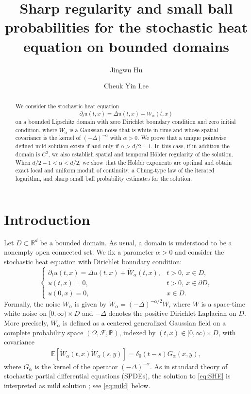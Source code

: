 \documentclass[reqno]{amsart}
\title[Stochastic heat equation]{Sharp regularity and small ball probabilities for the stochastic heat equation on bounded domains}
\author[J. Hu and C. Y. Lee]{Jingwu Hu \and Cheuk Yin Lee}
\newcommand{\R}{\mathbb R}
\newcommand{\E}{\mathbb E}
\renewcommand{\P}{\mathbb P}
\newcommand{\1}{\mathbf 1}
\numberwithin{equation}{section}
\theoremstyle{definition}
\begin{document}
\begin{abstract}
We consider the stochastic heat equation
\[
	\partial_t u(t,x) = \Delta u(t,x) + \dot{W}_\alpha(t,x)
\]
on a bounded Lipschitz domain with zero Dirichlet boundary condition and zero initial condition, where $\dot{W}_\alpha$ is a Gaussian noise that is white in time and whose spatial covariance is the kernel of $(-\Delta)^{-\alpha}$ with $\alpha>0$. We prove that a unique pointwise defined mild solution exists if and only if $\alpha>d/2-1$. In this case, if in addition the domain is $C^2$, we also establish spatial and temporal H\"older regularity of the solution.
When $d/2-1<\alpha<d/2$, we show that the H\"older exponents are optimal and obtain exact local and uniform moduli of continuity, a Chung-type law of the iterated logarithm, and sharp small ball probability estimates for the solution.
\end{abstract}

\maketitle

\section{Introduction}

Let \(D\subset\R^d\) be a bounded domain. 
As usual, a domain is understood to be a nonempty open connected set. 
We fix a parameter $\alpha > 0$ and consider the stochastic heat equation with Dirichlet boundary condition:
\begin{equation}\label{eq:SHE}
	\begin{cases}
		\partial_t u(t,x)=\Delta u(t,x)+\dot W_\alpha(t,x),
    	& t>0,\ x\in D,\\
		u(t,x)=0, & t>0,\ x\in\partial D,\\
		u(0,x)=0, & x\in D.
	\end{cases}
\end{equation}
Formally, the noise $\dot W_\alpha$ is given by $\dot W_\alpha = (-\Delta)^{-\alpha/2} \dot W$, where $\dot W$ is a space-time white noise on $[0,\infty) \times D$ and $-\Delta$ denotes the positive Dirichlet Laplacian on $D$.
More precisely, $\dot W_\alpha$ is defined as a centered generalized Gaussian field on a complete probability space $(\Omega, \mathcal{F}, \P)$, indexed by $(t,x) \in [0,\infty) \times D$, with covariance
\begin{align}\label{W:corr:G}
    \E[\dot W_\alpha(t,x) \dot W_\alpha(s,y)] = \delta_0(t-s) G_{\alpha}(x,y),
\end{align}
where $G_{\alpha}$ is the kernel of the operator $(-\Delta)^{-\alpha}$.
As in standard theory of stochastic partial differential equations (SPDEs), the solution to \eqref{eq:SHE} is interpreted as mild solution \cite{Walsh,Dalang,DPZ}; see \eqref{eq:mild} below.
\end{document}
